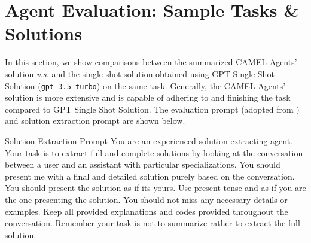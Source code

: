 \clearpage

\section{Agent Evaluation: Sample Tasks \& Solutions}

In this section, we show comparisons between the summarized CAMEL Agents' solution \textit{v.s.} and the single shot solution obtained using GPT Single Shot Solution (\texttt{gpt-3.5-turbo}) on the same task. Generally, the CAMEL Agents' solution is more extensive and is capable of adhering to and finishing the task compared to GPT Single Shot Solution. The evaluation prompt (adopted from \cite{vicuna}) and solution extraction prompt are shown below.

\begin{AIBox}{Solution Extraction Prompt}
	You are an experienced solution extracting agent.
	Your task is to extract full and complete solutions by looking at the conversation between a user and an assistant with particular specializations.
	You should present me with a final and detailed solution purely based on the conversation.
	You should present the solution as if its yours.
	Use present tense and as if you are the one presenting the solution.
	You should not miss any necessary details or examples.
	Keep all provided explanations and codes provided throughout the conversation.
	Remember your task is not to summarize rather to extract the full solution.
\end{AIBox}

